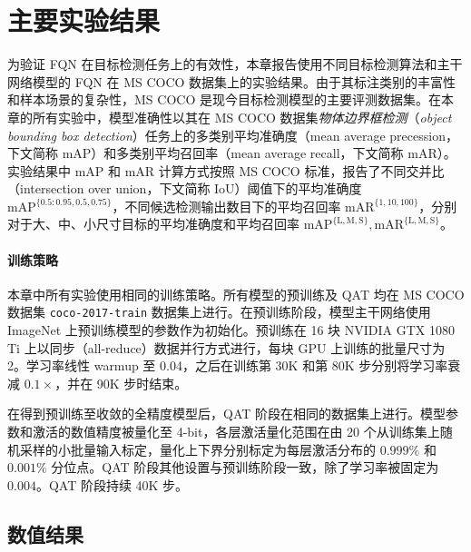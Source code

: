 \documentclass[
]{shtthesis}
\providecommand{\mAP}[1]{\mathrm{mAP}^{\mathrm{ #1 }}}
\providecommand{\mAR}[1]{\mathrm{mAR}^{\mathrm{ #1 }}}
\begin{document}
\section{主要实验结果} \label{sec::fqn::experiments}
为验证 FQN 在目标检测任务上的有效性，本章报告使用不同目标检测算法和主干网络模型的 FQN 在 MS COCO 数据集上的实验结果。由于其标注类别的丰富性和样本场景的复杂性，MS COCO 是现今目标检测模型的主要评测数据集。在本章的所有实验中，模型准确性以其在 MS COCO 数据集\emph{物体边界框检测}（\emph{object bounding box detection}）任务上的多类别平均准确度（mean average precession，下文简称 mAP）和多类别平均召回率（mean average recall，下文简称 mAR）。实验结果中 mAP 和 mAR 计算方式按照 MS COCO 标准，报告了不同交并比（intersection over union，下文简称 IoU）阈值下的平均准确度 $\mAP{\{0.5:0.95, 0.5, 0.75\}}$，不同候选检测输出数目下的平均召回率 $\mAR{\{1, 10, 100\}}$，分别对于大、中、小尺寸目标的平均准确度和平均召回率 $\mAP{\{L, M, S\}}, \mAR{\{L, M, S\}}$。

\paragraph{训练策略}
本章中所有实验使用相同的训练策略。所有模型的预训练及 QAT 均在 MS COCO 数据集 \verb|coco-2017-train| 数据集上进行。在预训练阶段，模型主干网络使用 ImageNet 上预训练模型的参数作为初始化。预训练在 16 块 NVIDIA GTX 1080 Ti 上以同步（all-reduce）数据并行方式进行，每块 GPU 上训练的批量尺寸为 2。学习率线性 warmup 至 0.04，之后在训练第 30K 和第 80K 步分别将学习率衰减 $0.1\times$，并在 90K 步时结束。

在得到预训练至收敛的全精度模型后，QAT 阶段在相同的数据集上进行。模型参数和激活的数值精度被量化至 4-bit，各层激活量化范围在由 20 个从训练集上随机采样的小批量输入标定，量化上下界分别标定为每层激活分布的 $0.999\%$ 和 $0.001\%$ 分位点。QAT 阶段其他设置与预训练阶段一致，除了学习率被固定为 $0.004$。QAT 阶段持续 40K 步。
\subsection{数值结果} \label{sec::fqn::main_exp}
\end{document}
